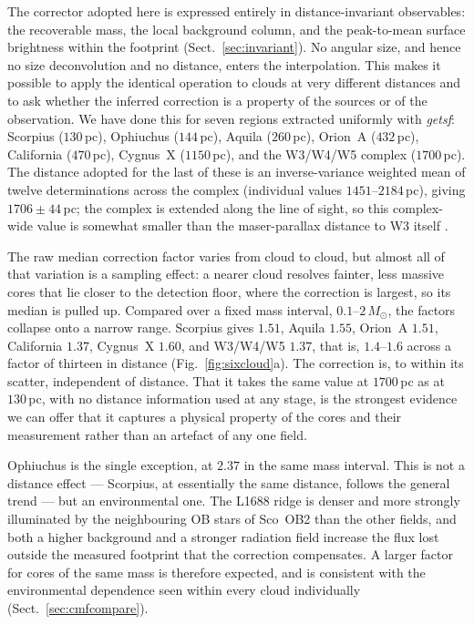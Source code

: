 \documentclass[11pt,a4paper]{article}
\newcommand{\msun}{M_{\odot}}
\begin{document}
The corrector adopted here is expressed entirely in distance-invariant
observables: the recoverable mass, the local background column, and the
peak-to-mean surface brightness within the footprint
(Sect.~\ref{sec:invariant}). No angular size, and hence no size deconvolution
and no distance, enters the interpolation. This makes it
possible to apply the identical operation to clouds at very different
distances and to ask whether the inferred correction is a property of the
sources or of the observation. We have done this for seven regions extracted
uniformly with \emph{getsf}: Scorpius ($130$\,pc), Ophiuchus ($144$\,pc),
Aquila ($260$\,pc), Orion~A ($432$\,pc), California ($470$\,pc), Cygnus~X
($1150$\,pc), and the W3/W4/W5 complex ($1700$\,pc). The distance adopted for the last of these is
an inverse-variance weighted mean of twelve determinations across the complex
(individual values $1451$--$2184$\,pc), giving $1706\pm44$\,pc; the complex is
extended along the line of sight, so this complex-wide value is somewhat
smaller than the maser-parallax distance to W3 itself \citep[$\sim$$2$\,kpc;
][]{Xu+2006}.

The raw median correction factor varies from cloud to cloud, but almost all of
that variation is a sampling effect: a nearer cloud resolves fainter, less
massive cores that lie closer to the detection floor, where the correction is
largest, so its median is pulled up. Compared over a fixed mass interval,
$0.1$--$2\,\msun$, the factors collapse onto a narrow range. Scorpius gives
$1.51$, Aquila $1.55$, Orion~A $1.51$, California $1.37$, Cygnus~X $1.60$, and
W3/W4/W5 $1.37$, that is, $1.4$--$1.6$ across a factor of thirteen in distance
(Fig.~\ref{fig:sixcloud}a). The correction is, to within its scatter,
independent of distance. That it takes the same value at $1700$\,pc as at
$130$\,pc, with no distance information used at any stage, is the strongest
evidence we can offer that it captures a physical property of the cores and
their measurement rather than an artefact of any one field.

Ophiuchus is the single exception, at $2.37$ in the same mass interval. This
is not a distance effect --- Scorpius, at essentially the same distance,
follows the general trend --- but an environmental one. The L1688 ridge is
denser and more strongly illuminated by the neighbouring OB stars of
Sco~OB2 than the other fields, and both a higher background and a stronger
radiation field increase the flux lost outside the measured footprint that the
correction compensates. A larger factor for cores of the same mass is
therefore expected, and is consistent with the environmental dependence seen
within every cloud individually (Sect.~\ref{sec:cmfcompare}).
\end{document}
